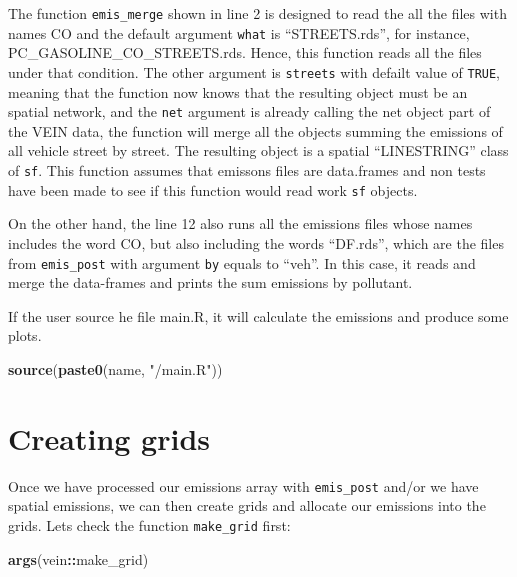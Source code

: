 \documentclass[12pt,graybox,envcountchap,sectrefs]{krantz}
\makeatletter
\newenvironment{Shaded}{\begin{snugshade}}{\end{snugshade}}
\newcommand{\KeywordTok}[1]{\textcolor[rgb]{0.13,0.29,0.53}{\textbf{#1}}}
\newcommand{\StringTok}[1]{\textcolor[rgb]{0.31,0.60,0.02}{#1}}
\newcommand{\OperatorTok}[1]{\textcolor[rgb]{0.81,0.36,0.00}{\textbf{#1}}}
\newcommand{\NormalTok}[1]{#1}
\newenvironment{kframe}{%
\medskip{}
\setlength{\fboxsep}{.8em}
 \def\at@end@of@kframe{}%
 \ifinner\ifhmode%
  \def\at@end@of@kframe{\end{minipage}}%
  \begin{minipage}{\columnwidth}%
 \fi\fi%
 \def\FrameCommand##1{\hskip\@totalleftmargin \hskip-\fboxsep
 \colorbox{shadecolor}{##1}\hskip-\fboxsep
     \hskip-\linewidth \hskip-\@totalleftmargin \hskip\columnwidth}%
 \MakeFramed {\advance\hsize-\width
   \@totalleftmargin\z@ \linewidth\hsize
   \@setminipage}}%
 {\par\unskip\endMakeFramed%
 \at@end@of@kframe}
\renewenvironment{Shaded}{\begin{kframe}}{\end{kframe}}
\theoremstyle{definition}
\theoremstyle{definition}
\theoremstyle{definition}
\theoremstyle{remark}
\makeatother
\begin{document}
The function \texttt{emis\_merge} shown in line 2 is designed to read
the all the files with names CO and the default argument \texttt{what}
is ``STREETS.rds'', for instance, PC\_GASOLINE\_CO\_STREETS.rds. Hence,
this function reads all the files under that condition. The other
argument is \texttt{streets} with defailt value of \texttt{TRUE},
meaning that the function now knows that the resulting object must be an
spatial network, and the \texttt{net} argument is already calling the
net object part of the VEIN data, the function will merge all the
objects summing the emissions of all vehicle street by street. The
resulting object is a spatial ``LINESTRING'' class of \texttt{sf}. This
function assumes that emissons files are data.frames and non tests have
been made to see if this function would read work \texttt{sf} objects.

On the other hand, the line 12 also runs all the emissions files whose
names includes the word CO, but also including the words ``DF.rds'',
which are the files from \texttt{emis\_post} with argument \texttt{by}
equals to ``veh''. In this case, it reads and merge the data-frames and
prints the sum emissions by pollutant.

If the user source he file main.R, it will calculate the emissions and
produce some plots.

\begin{Shaded}
\begin{Highlighting}[]
\KeywordTok{source}\NormalTok{(}\KeywordTok{paste0}\NormalTok{(name, }\StringTok{"/main.R"}\NormalTok{))}
\end{Highlighting}
\end{Shaded}

\section{Creating grids}\label{creating-grids}

Once we have processed our emissions array with \texttt{emis\_post}
and/or we have spatial emissions, we can then create grids and allocate
our emissions into the grids. Lets check the function
\texttt{make\_grid} first:

\begin{Shaded}
\begin{Highlighting}[]
\KeywordTok{args}\NormalTok{(vein}\OperatorTok{::}\NormalTok{make_grid)}
\end{Highlighting}
\end{Shaded}
\end{document}
